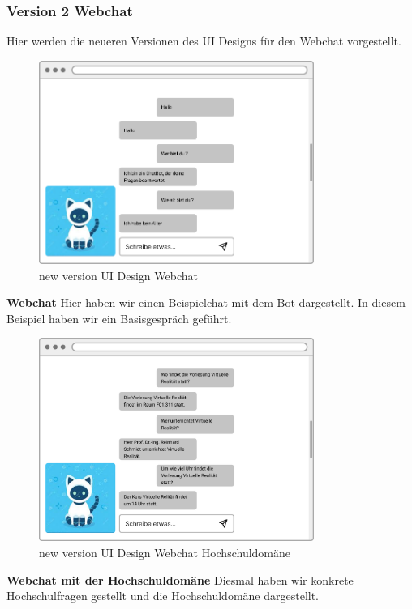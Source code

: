 \subsubsection{Version 2 Webchat}
Hier werden die neueren Versionen des UI Designs für den Webchat vorgestellt.
\begin{figure}[H]
    \centering
    \includegraphics[width=0.8\textwidth]{bilder/new vers. UI Design/WebChat/WebChat.png}
    \caption{new version UI Design Webchat}
    \label{fig:new version UI Design Webchat}
    \end{figure}
\noindent \textbf{Webchat} \newline
Hier haben wir einen Beispielchat mit dem Bot dargestellt. In diesem Beispiel haben wir ein
Basisgespräch geführt.

\begin{figure}[H]
    \centering
    \includegraphics[width=0.8\textwidth]{bilder/new vers. UI Design/WebChat/WebChat Hochschule.png}
    \caption{new version UI Design Webchat Hochschuldomäne}
    \label{fig:new version UI Design Webchat Hochschuldomäne}
    \end{figure}
\noindent \textbf{Webchat mit der Hochschuldomäne} \newline
Diesmal haben wir konkrete Hochschulfragen gestellt und die Hochschuldomäne dargestellt.

